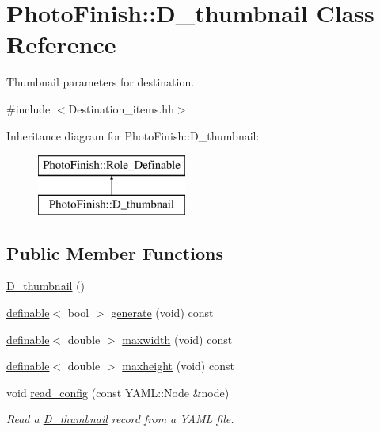 \hypertarget{class_photo_finish_1_1_d__thumbnail}{}\section{Photo\+Finish\+:\+:D\+\_\+thumbnail Class Reference}
\label{class_photo_finish_1_1_d__thumbnail}


Thumbnail parameters for destination.  




{\ttfamily \#include $<$Destination\+\_\+items.\+hh$>$}

Inheritance diagram for Photo\+Finish\+:\+:D\+\_\+thumbnail\+:\begin{figure}[H]
\begin{center}
\leavevmode
\includegraphics[height=2.000000cm]{class_photo_finish_1_1_d__thumbnail}
\end{center}
\end{figure}
\subsection*{Public Member Functions}
\begin{DoxyCompactItemize}
\item 
\hyperlink{class_photo_finish_1_1_d__thumbnail_a3656b828df1e7e6b31f1b6714f1c6432}{D\+\_\+thumbnail} ()
\item 
\hyperlink{class_photo_finish_1_1definable}{definable}$<$ bool $>$ \hyperlink{class_photo_finish_1_1_d__thumbnail_a95fd0394e3018382f9e3f3122e7cff86}{generate} (void) const
\item 
\hyperlink{class_photo_finish_1_1definable}{definable}$<$ double $>$ \hyperlink{class_photo_finish_1_1_d__thumbnail_aacf0bd74fdf6042db4759e0c77241304}{maxwidth} (void) const
\item 
\hyperlink{class_photo_finish_1_1definable}{definable}$<$ double $>$ \hyperlink{class_photo_finish_1_1_d__thumbnail_aebf0a38bb2970fa9d8c464b7a3d87254}{maxheight} (void) const
\item 
void \hyperlink{class_photo_finish_1_1_d__thumbnail_a3e73494385dd7ff917a162461e7f2d73}{read\+\_\+config} (const Y\+A\+M\+L\+::\+Node \&node)
\begin{DoxyCompactList}\small\item\em Read a \hyperlink{class_photo_finish_1_1_d__thumbnail}{D\+\_\+thumbnail} record from a Y\+A\+ML file. \end{DoxyCompactList}\end{DoxyCompactItemize}
